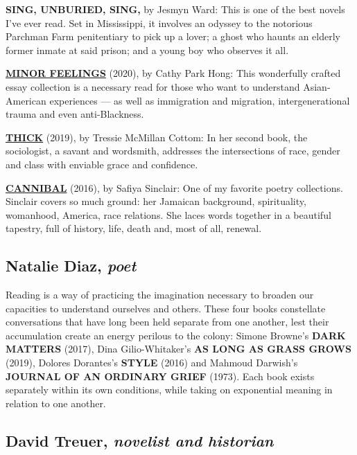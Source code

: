 \textbf{SING, UNBURIED, SING,} by Jesmyn Ward: This is one of the best
novels I've ever read. Set in Mississippi, it involves an odyssey to the
notorious Parchman Farm penitentiary to pick up a lover; a ghost who
haunts an elderly former inmate at said prison; and a young boy who
observes it all.

\textbf{\href{https://www.nytimes.com/2020/02/17/books/review-minor-feelings-cathy-park-hong.html}{MINOR
FEELINGS}} (2020), by Cathy Park Hong: This wonderfully crafted essay
collection is a necessary read for those who want to understand
Asian-American experiences --- as well as immigration and migration,
intergenerational trauma and even anti-Blackness.

\textbf{\href{https://www.nytimes.com/2019/02/12/books/review/thick-tressie-mcmillan-cottom.html}{THICK}}
(2019), by Tressie McMillan Cottom: In her second book, the sociologist,
a savant and wordsmith, addresses the intersections of race, gender and
class with enviable grace and confidence.

\textbf{\href{https://www.nytimes.com/2018/11/30/t-magazine/black-women-writers.html}{CANNIBAL}}
(2016), by Safiya Sinclair: One of my favorite poetry collections.
Sinclair covers so much ground: her Jamaican background, spirituality,
womanhood, America, race relations. She laces words together in a
beautiful tapestry, full of history, life, death and, most of all,
renewal.

\hypertarget{natalie-diaz-poet}{%
\subsection{\texorpdfstring{Natalie Diaz,
\emph{poet}}{Natalie Diaz, poet}}\label{natalie-diaz-poet}}

Reading is a way of practicing the imagination necessary to broaden our
capacities to understand ourselves and others. These four books
constellate conversations that have long been held separate from one
another, lest their accumulation create an energy perilous to the
colony: Simone Browne's \textbf{DARK MATTERS} (2017), Dina
Gilio-Whitaker's \textbf{AS LONG AS GRASS GROWS} (2019), Dolores
Dorantes's \textbf{STYLE} (2016) and Mahmoud Darwish's \textbf{JOURNAL
OF AN ORDINARY GRIEF} (1973). Each book exists separately within its own
conditions, while taking on exponential meaning in relation to one
another.

\hypertarget{david-treuer-novelist-and-historian}{%
\subsection{\texorpdfstring{David Treuer, \emph{novelist and
historian}}{David Treuer, novelist and historian}}\label{david-treuer-novelist-and-historian}}

